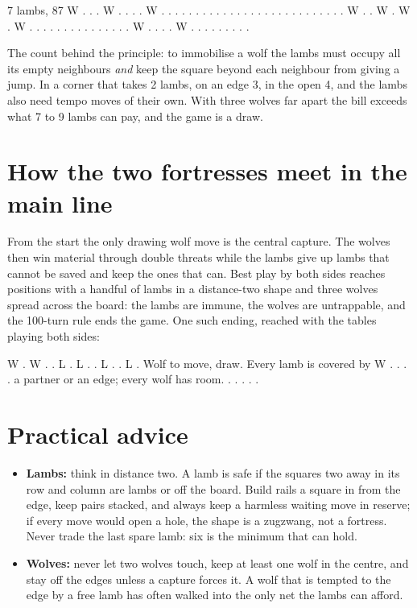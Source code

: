 \documentclass[11pt,a4paper]{article}
\begin{document}
\begin{board}
   7 lambs, 87%
   W . . . W              . . . . W              . . . . .
   . . . . .              . . . . .              . . . . .
   . . . . .              . . W . .              W . W . W
   . . . . .              . . . . .              . . . . .
   W . . . .              W . . . .              . . . . .
\end{board}

The count behind the principle: to immobilise a wolf the lambs must occupy all its
empty neighbours \emph{and} keep the square beyond each neighbour from giving a
jump. In a corner that takes 2 lambs, on an edge 3, in the open 4, and the
lambs also need tempo moves of their own. With three wolves far apart the bill
exceeds what 7 to 9 lambs can pay, and the game is a draw.

\section*{How the two fortresses meet in the main line}

From the start the only drawing wolf move is the central capture. The wolves
then win material through double threats while the lambs give up lambs that
cannot be saved and keep the ones that can. Best play by both sides reaches
positions with a handful of lambs in a distance-two shape and three wolves spread
across the board: the lambs are immune, the wolves are untrappable, and the
100-turn rule ends the game. One such ending, reached with the tables playing
both sides:

\begin{board}
   W . W . .
   L . L . .
   L . . L .        Wolf to move, draw. Every lamb is covered by
   W . . . .        a partner or an edge; every wolf has room.
   . . . . .
\end{board}

\section*{Practical advice}

\begin{itemize}
\item \textbf{Lambs:} think in distance two. A lamb is safe if the squares two
away in its row and column are lambs or off the board. Build rails a square in
from the edge, keep pairs stacked, and always keep a harmless waiting move in
reserve; if every move would open a hole, the shape is a zugzwang, not a
fortress. Never trade the last spare lamb: six is the minimum that can hold.
\item \textbf{Wolves:} never let two wolves touch, keep at least one wolf in the
centre, and stay off the edges unless a capture forces it. A wolf that is
tempted to the edge by a free lamb has often walked into the only net the lambs
can afford.
\end{itemize}
\end{document}
